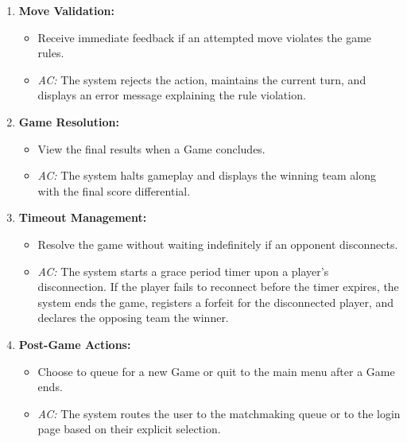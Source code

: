 \documentclass{scrartcl}
\begin{document}
\begin{enumerate}[label=F\arabic*.,ref=F\arabic*]
\begin{itemize}
        \item View the real-time game state, including the current turn, active Trump suit, current score, and the cards played in the last Trick.
        \item \textit{AC:} The client interface accurately reflects the server-side state without requiring manual page reloads.
    \end{itemize}
    \item \label{f:move-validation} \textbf{Move Validation:}
    \begin{itemize}
        \item Receive immediate feedback if an attempted move violates the game rules.
        \item \textit{AC:} The system rejects the action, maintains the current turn, and displays an error message explaining the rule violation.
    \end{itemize}
    \item \label{f:game-resolution} \textbf{Game Resolution:}
    \begin{itemize}
        \item View the final results when a Game concludes.
        \item \textit{AC:} The system halts gameplay and displays the winning team along with the final score differential.
    \end{itemize}
    \item \label{f:timeout-managment} \textbf{Timeout Management:}
    \begin{itemize}
        \item Resolve the game without waiting indefinitely if an opponent disconnects.
        \item \textit{AC:} The system starts a grace period timer upon a player's disconnection. If the player fails to reconnect before the timer expires, the system ends the game, registers a forfeit for the disconnected player, and declares the opposing team the winner.
    \end{itemize}
    \item \label{f:post-game} \textbf{Post-Game Actions:}
    \begin{itemize}
        \item Choose to queue for a new Game or quit to the main menu after a Game ends.
        \item \textit{AC:} The system routes the user to the matchmaking queue or to the login page based on their explicit selection.
    \end{itemize}
\end{enumerate}
\end{document}
